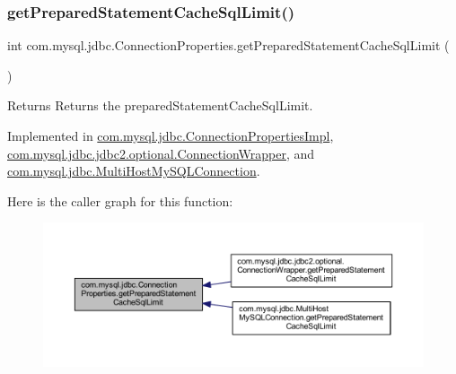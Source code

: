 \subsubsection{\texorpdfstring{get\+Prepared\+Statement\+Cache\+Sql\+Limit()}{getPreparedStatementCacheSqlLimit()}}
{\footnotesize\ttfamily int com.\+mysql.\+jdbc.\+Connection\+Properties.\+get\+Prepared\+Statement\+Cache\+Sql\+Limit (\begin{DoxyParamCaption}{ }\end{DoxyParamCaption})}

\begin{DoxyReturn}{Returns}
Returns the prepared\+Statement\+Cache\+Sql\+Limit. 
\end{DoxyReturn}


Implemented in \mbox{\hyperlink{classcom_1_1mysql_1_1jdbc_1_1_connection_properties_impl_a5470990923e677d14d3bfb985b7f2e6d}{com.\+mysql.\+jdbc.\+Connection\+Properties\+Impl}}, \mbox{\hyperlink{classcom_1_1mysql_1_1jdbc_1_1jdbc2_1_1optional_1_1_connection_wrapper_ac12acf3f17ba3cff3c14bce4eff86c66}{com.\+mysql.\+jdbc.\+jdbc2.\+optional.\+Connection\+Wrapper}}, and \mbox{\hyperlink{classcom_1_1mysql_1_1jdbc_1_1_multi_host_my_s_q_l_connection_a183bd1cac2423d1b6c228c310cb6d43b}{com.\+mysql.\+jdbc.\+Multi\+Host\+My\+S\+Q\+L\+Connection}}.

Here is the caller graph for this function\+:\nopagebreak
\begin{figure}[H]
\begin{center}
\leavevmode
\includegraphics[width=350pt]{interfacecom_1_1mysql_1_1jdbc_1_1_connection_properties_a4bcee0f0e555dcada01589d7b4168a4e_icgraph}
\end{center}
\end{figure}
\mbox{\label{interfacecom_1_1mysql_1_1jdbc_1_1_connection_properties_af0e1c9e18770d1c2478851ab1dcd1d70}} 
